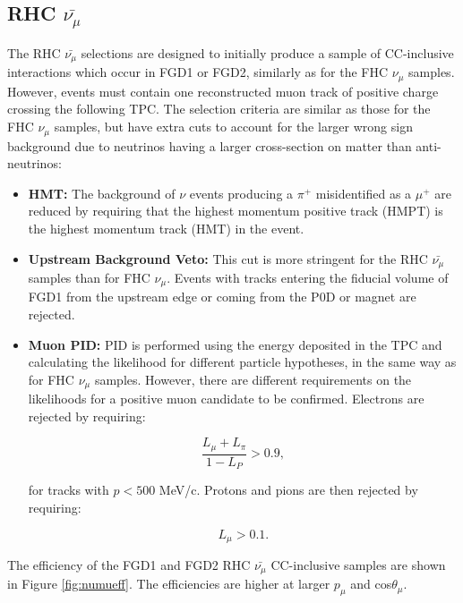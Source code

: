 \subsection{RHC $\bar{\nu_{\mu}}$}

The RHC $\bar{\nu_{\mu}}$ selections are designed to initially produce a sample of CC-inclusive interactions which occur in FGD1 or FGD2, similarly as for the FHC $\nu_{\mu}$ samples. However, events must contain one reconstructed muon track of positive charge crossing the following TPC. The selection criteria are similar as those for the FHC $\nu_{\mu}$ samples, but have extra cuts to account for the larger wrong sign background due to neutrinos having a larger cross-section on matter than anti-neutrinos:

\begin{itemize}

\item \textbf{HMT:} The background of $\nu$ events producing a $\pi^+$ misidentified as a $\mu^+$ are reduced by requiring that the highest momentum positive track (HMPT) is the highest momentum track (HMT) in the event.

\item \textbf{Upstream Background Veto:} This cut is more stringent for the RHC $\bar{\nu_{\mu}}$ samples than for FHC $\nu_{\mu}$. Events with tracks entering the fiducial volume of FGD1 from the upstream edge or coming from the P0D or magnet are rejected.

\item \textbf{Muon PID:} PID is performed using the energy deposited in the TPC and calculating the likelihood for different particle hypotheses, in the same way as for FHC $\nu_{\mu}$ samples. However, there are different requirements on the likelihoods for a positive muon candidate to be confirmed. Electrons are rejected by requiring:

\begin{equation}
\frac{L_{\mu}+L_{\pi}}{1-L_P} > 0.9,
\end{equation}

for tracks with  $p < 500$ MeV/c. Protons and pions are then rejected by requiring:

\begin{equation}
L_{\mu} > 0.1.
\end{equation}

\end{itemize}

The efficiency of the FGD1 and FGD2 RHC $\bar{\nu_{\mu}}$ CC-inclusive samples are shown in Figure \ref{fig:numueff}.  The efficiencies are higher at larger $p_{\mu}$ and cos$\theta_{\mu}$. 

